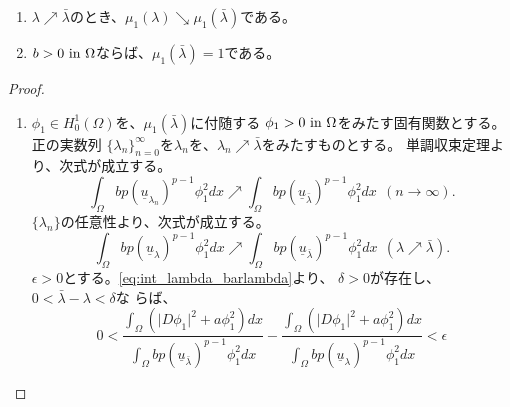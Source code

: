 \begin{lem}
 \begin{enumerate}[1.] \sage
  \item $\lambda \nearrow \bar{\lambda}$のとき、$\mu_1(\lambda)
        \searrow \mu_1(\bar{\lambda})$である。
  \item $b > 0 ~\text{in}~ \Omega$ならば、$\mu_1(\bar{\lambda}) = 1$である。
 \end{enumerate}
\end{lem}
\begin{proof}
 \begin{enumerate}[1.] \sage
  \item $\phi_1 \in H_0^1(\Omega)$を、$\mu_1(\bar{\lambda})$に付随する
        $\phi_1 > 0 ~\text{in}~ \Omega$をみたす固有関数とする。
        正の実数列
        $\{\lambda_n \}_{n=0}^\infty$を$\lambda_n$を、$\lambda_n
        \nearrow \bar{\lambda}$をみたすものとする。
        単調収束定理より、次式が成立する。
        \[
         \int_\Omega bp ( \underline{u}_{\lambda_n} )^{p-1} \phi_1^2
          dx \nearrow \int_\Omega bp
          (\underline{u}_{\bar{\lambda}})^{p-1} \phi_1^2 dx  \ \ (n
        \to \infty).        
        \]
        $\{\lambda_n \}$の任意性より、次式が成立する。
        \begin{equation}
         \int_\Omega bp ( \underline{u}_{\lambda} )^{p-1} \phi_1^2
          dx \nearrow \int_\Omega bp
          (\underline{u}_{\bar{\lambda}})^{p-1} \phi_1^2 dx
           \ \ (\lambda \nearrow \bar{\lambda}).
          \label{eq:int_lambda_barlambda}
        \end{equation}
        $\epsilon > 0$とする。\eqref{eq:int_lambda_barlambda}より、
        $\delta > 0$が存在し、$0 < \bar{\lambda} - \lambda < \delta$な
        らば、
        \begin{equation}
         0 < \frac{\displaystyle \int_\Omega \left( \lvert D\phi_1
                                              \rvert^2
                                              + a
                                             \phi_1^2\right) dx}
         {\displaystyle 
         \int_\Omega bp (\underline{u}_{\bar{\lambda}})^{p-1} \phi_1^2 dx}
         -
         \frac{\displaystyle \int_\Omega \left( \lvert D\phi_1
                                              \rvert^2
                                              + a
                                             \phi_1^2\right) dx}
         {\displaystyle 
         \int_\Omega bp (\underline{u}_{\lambda})^{p-1} \phi_1^2
         dx} < \epsilon \label{eq:zero_int_epsilon}
        \end{equation}

\end{enumerate}
\end{proof}
